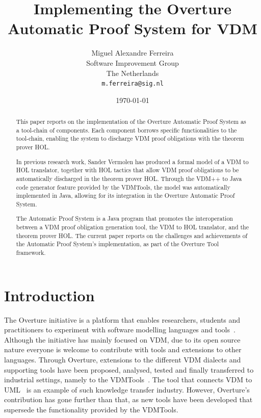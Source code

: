 \documentclass[]{article}
\title{Implementing the Overture Automatic Proof System for VDM}
\author{Miguel Alexandre Ferreira\\
        Software Improvement Group\\
		The Netherlands\\ 
		\texttt{m.ferreira@sig.nl}}
\date{\today}
\begin{document}
\maketitle
\begin{abstract}
This paper reports on the implementation of the Overture Automatic Proof System as a tool-chain of components.
Each component borrows specific functionalities to the tool-chain, enabling the system to discharge VDM proof obligations with the theorem prover HOL.

In previous research work, Sander Vermolen has produced a formal model of a VDM to HOL translator, together with HOL tactics that allow VDM proof obligations to be automatically discharged in the theorem prover HOL.
Through the VDM++ to Java code generator feature provided by the VDMTools, the model was automatically implemented in Java, allowing for its integration in the Overture Automatic Proof System.

The Automatic Proof System is a Java program that promotes the interoperation between a VDM proof obligation generation tool, the VDM to HOL translator, and the theorem prover HOL.
The current paper reports on the challenges and achievements of the Automatic Proof System's implementation, as part of the Overture Tool framework.
\end{abstract}

\section{Introduction}
\label{sec:introduction}

The Overture initiative is a platform that enables researchers, students and practitioners to experiment with software modelling languages and tools~\cite{LarsenBFL08}.
Although the initiative has mainly focused on VDM, due to its open source nature everyone is welcome to contribute with tools and extensions to other languages.
Through Overture, extensions to the different VDM dialects and supporting tools have been proposed, analysed, tested and finally transferred to industrial settings, namely to the VDMTools~\cite{DBLP:journals/sigplan/FitzgeraldLS08}.
The tool that connects VDM to UML~\cite{Lausdahl08,Lausdahl09} is an example of such knowledge transfer industry.
However, Overture's contribution has gone further than that, as new tools have been developed that supersede the functionality provided by the VDMTools.
\end{document}
